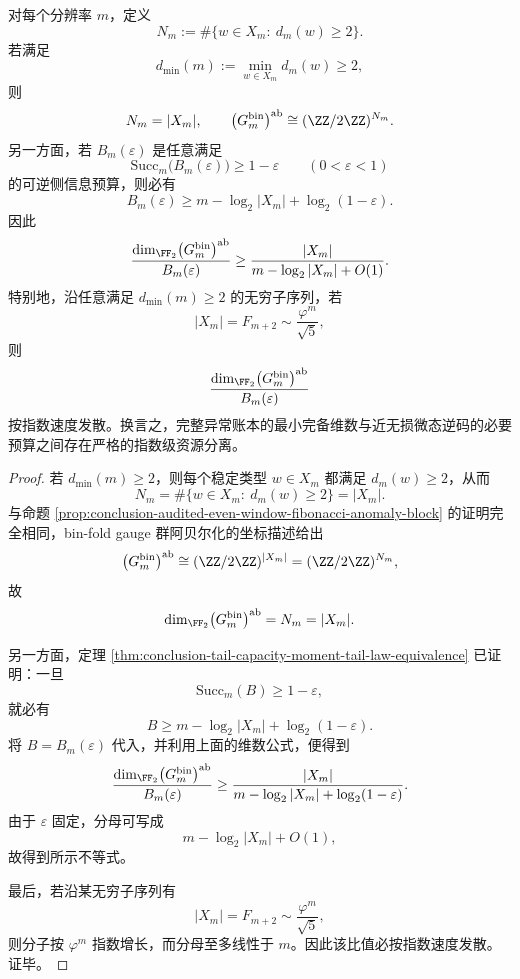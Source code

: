 \begin{theorem}[完整异常账本与近无损逆码预算的指数分离]\label{thm:conclusion-binfold-anomaly-ledger-vs-nearlossless-budget-exponential-separation}
对每个分辨率 \(m\)，定义
\[
N_m:=\#\{w\in X_m:\ d_m(w)\ge 2\}.
\]
若满足
\[
d_{\min}(m):=\min_{w\in X_m}d_m(w)\ge 2,
\]
则
\[
N_m=|X_m|,
\qquad
\bigl(G_m^{\mathrm{bin}}\bigr)^{\mathrm{ab}}
\cong
(\ZZ/2\ZZ)^{N_m}.
\]
另一方面，若 \(B_m(\varepsilon)\) 是任意满足
\[
\mathrm{Succ}_m\!\bigl(B_m(\varepsilon)\bigr)\ge 1-\varepsilon
\qquad (0<\varepsilon<1)
\]
的可逆侧信息预算，则必有
\[
B_m(\varepsilon)\ge m-\log_2|X_m|+\log_2(1-\varepsilon).
\]
因此
\[
\frac{\dim_{\FF_2}\bigl(G_m^{\mathrm{bin}}\bigr)^{\mathrm{ab}}}{B_m(\varepsilon)}
\ge
\frac{|X_m|}{m-\log_2|X_m|+O(1)}.
\]
特别地，沿任意满足 \(d_{\min}(m)\ge 2\) 的无穷子序列，若
\[
|X_m|=F_{m+2}\sim \frac{\varphi^m}{\sqrt5},
\]
则
\[
\frac{\dim_{\FF_2}\bigl(G_m^{\mathrm{bin}}\bigr)^{\mathrm{ab}}}{B_m(\varepsilon)}
\]
按指数速度发散。换言之，完整异常账本的最小完备维数与近无损微态逆码的必要预算之间存在严格的指数级资源分离。
\end{theorem}
\begin{proof}
若 \(d_{\min}(m)\ge 2\)，则每个稳定类型 \(w\in X_m\) 都满足 \(d_m(w)\ge 2\)，从而
\[
N_m=\#\{w\in X_m:\ d_m(w)\ge 2\}=|X_m|.
\]
与命题 \ref{prop:conclusion-audited-even-window-fibonacci-anomaly-block} 的证明完全相同，bin-fold gauge 群阿贝尔化的坐标描述给出
\[
\bigl(G_m^{\mathrm{bin}}\bigr)^{\mathrm{ab}}
\cong
(\ZZ/2\ZZ)^{|X_m|}
=
(\ZZ/2\ZZ)^{N_m},
\]
故
\[
\dim_{\FF_2}\bigl(G_m^{\mathrm{bin}}\bigr)^{\mathrm{ab}}=N_m=|X_m|.
\]

另一方面，定理 \ref{thm:conclusion-tail-capacity-moment-tail-law-equivalence} 已证明：一旦
\[
\mathrm{Succ}_m(B)\ge 1-\varepsilon,
\]
就必有
\[
B\ge m-\log_2|X_m|+\log_2(1-\varepsilon).
\]
将 \(B=B_m(\varepsilon)\) 代入，并利用上面的维数公式，便得到
\[
\frac{\dim_{\FF_2}\bigl(G_m^{\mathrm{bin}}\bigr)^{\mathrm{ab}}}{B_m(\varepsilon)}
\ge
\frac{|X_m|}{m-\log_2|X_m|+\log_2(1-\varepsilon)}.
\]
由于 \(\varepsilon\) 固定，分母可写成
\[
m-\log_2|X_m|+O(1),
\]
故得到所示不等式。

最后，若沿某无穷子序列有
\[
|X_m|=F_{m+2}\sim \frac{\varphi^m}{\sqrt5},
\]
则分子按 \(\varphi^m\) 指数增长，而分母至多线性于 \(m\)。因此该比值必按指数速度发散。证毕。
\end{proof}

